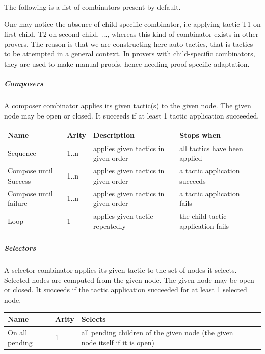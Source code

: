 The following is a list of combinators present by default.

One may notice the absence of child-specific combinator, i.e applying tactic T1 on first child, T2 on second child, ..., whereas this kind of combinator exists in other provers. The reason is that we are constructing here auto tactics, that is tactics to be attempted in a general context. In provers with child-specific combinators, they are used to make manual proofs, hence needing proof-specific adaptation.

\subparagraph{Composers}

A composer combinator applies its given tactic(s) to the given node. The given node may be open or closed. It succeeds if at least 1 tactic application succeeded. 

\begin{center}
    \begin{tabular}{ | l | l | l | l | p{5cm} |}
    \hline
	Name & Arity & Description & Stops when  \\ \hline
	Sequence & 1..n  & applies given tactics in given order & all tactics have been applied  \\ \hline
	Compose until Success & 1..n  & applies given tactics in given order & a tactic application succeeds \\ \hline
	Compose until failure  & 1..n  & applies given tactics in given order & a tactic application fails \\ \hline
	Loop & 1 & applies given tactic repeatedly & the child tactic application fails \\ \hline
    \end{tabular}
\end{center}

\subparagraph{Selectors}

A selector combinator applies its given tactic to the set of nodes it selects. Selected nodes are computed from the given node. The given node may be open or closed. It succeeds if the tactic application succeeded for at least 1 selected node. 

\begin{center}
    \begin{tabular}{ | l | l | l | p{5cm} |}
    \hline
	Name & Arity & Selects \\ \hline
	On all pending  & 1 & all pending children of the given node (the given node itself if it is open) \\ \hline
    \end{tabular}
\end{center}

